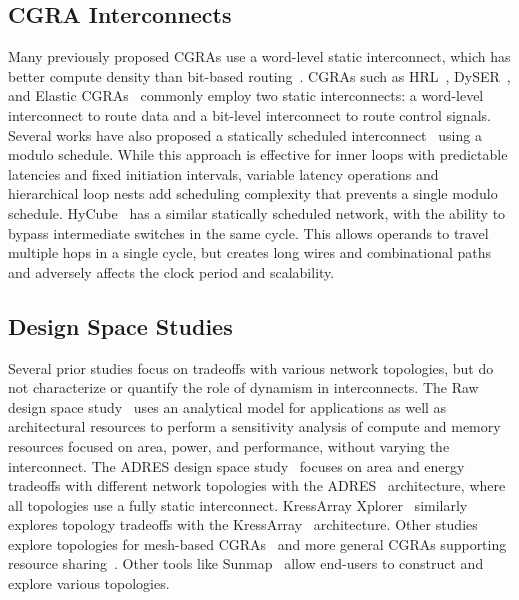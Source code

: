 \subsection{CGRA Interconnects}
Many previously proposed CGRAs use a word-level static interconnect, which has better compute density than bit-based routing~\cite{bus-fpga}. CGRAs such as HRL~\cite{hrl}, DySER~\cite{dyser}, and Elastic CGRAs~\cite{elasticCGRAs} commonly employ two static interconnects: a word-level interconnect to route data and a bit-level interconnect to route control signals.
Several works have also proposed a statically scheduled interconnect~\cite{van2009static, dimitroulakos2006exploring, wave} using a modulo schedule. While this approach is effective for inner loops with predictable latencies and fixed initiation intervals, variable latency operations and hierarchical loop nests add scheduling complexity that prevents a single modulo schedule. HyCube~\cite{hycube} has a similar statically scheduled network, with the ability to bypass intermediate switches in the same cycle. This allows operands to travel multiple hops in a single cycle, but creates long wires and combinational paths and adversely affects the clock period and scalability.
\subsection{Design Space Studies} Several prior studies focus on tradeoffs with various network topologies, but do not characterize or quantify the role of dynamism in interconnects.
The Raw design space study~\cite{dse-raw} uses an analytical model for applications as well as architectural resources to perform a sensitivity analysis of compute and memory resources focused on area, power, and performance, without varying the interconnect. The ADRES design space study~\cite{dse-adres} focuses on area and energy tradeoffs with different network topologies with the ADRES~\cite{adres} architecture, where all topologies use a fully static interconnect. KressArray Xplorer~\cite{dse-kressarray} similarly explores topology tradeoffs with the KressArray~\cite{kress} architecture. Other studies explore topologies for mesh-based CGRAs~\cite{dse-date} and more general CGRAs supporting resource sharing~\cite{dse-tvlsi}. Other tools like Sunmap~\cite{sunmap} allow end-users to construct and explore various topologies.

